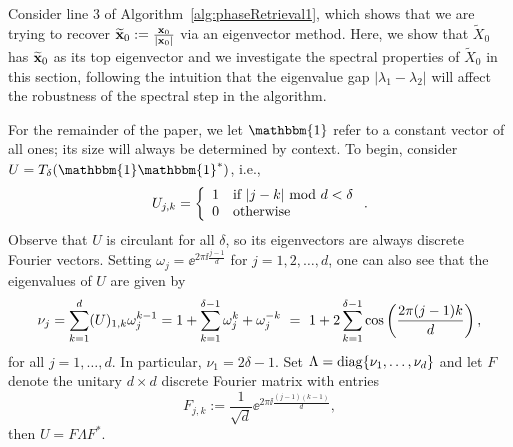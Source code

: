 
Consider line 3 of Algorithm~\ref{alg:phaseRetrieval1}, which shows that we are trying to recover $\widetilde{\mathbf x}_0:= \frac{{\mathbf x_0}}{|\mathbf x_0|}$ via an eigenvector method. Here, we show that  $\widetilde{X}_0$ has $\widetilde{\mathbf x}_0$ as its top eigenvector and we investigate the spectral properties of $\widetilde{X}_0$ in this section, following the intuition that the eigenvalue gap $|\lambda_1 - \lambda_2|$ will affect the robustness of the spectral step in the algorithm.

For the remainder of the paper, we let $\mathbbm{1}$ refer to a constant vector of all ones; its size will always be determined by context.  To begin, consider $U = T_\delta(\mathbbm{1}\mathbbm{1}^*)$, i.e., 
\begin{equation}
U_{j,k} =  \left\{ \begin{array}{ll} 1 & \textrm{if}~| j - k |~{\rm mod}~d  < \delta \\ 0 & \textrm{otherwise} \end{array} \right..
\label{equ:NormedUmatSPG}
\end{equation}
Observe that $U$ is circulant for all $\delta$, so its eigenvectors are always discrete Fourier vectors.  Setting $\omega_j = \ee^{2\pi\ii\frac{j-1}{d}}$ for $j = 1, 2, \ldots, d$, one can also see that the eigenvalues of $U$ are given by 
\begin{equation}
\nu_j = \sum_{k = 1}^d (U)_{1,k}\omega_j^{k-1} = 1 + \sum_{k = 1}^{\delta - 1}\omega_j^k + \omega_j^{-k} ~=~ 1 + 2 \sum_{k = 1}^{\delta - 1}\cos\left(\frac{\displaystyle 2\pi (j-1) k}{\displaystyle d}\right),
\label{eqn:lambda}
\end{equation}
for all $j = 1, \dots, d$.  In particular, $\nu_1 = 2 \delta - 1$.  Set $\Lambda = \mathrm{diag}\{\nu_1, \ldots, \nu_{d}\}$ and let $F$ denote the unitary $d \times d$ discrete Fourier matrix with entries 
$$F_{j,k} := \frac{1}{\sqrt{d}} \ee^{2\pi\ii\frac{(j-1)(k-1)}{d}},$$ then $U = F \Lambda F^*$.

